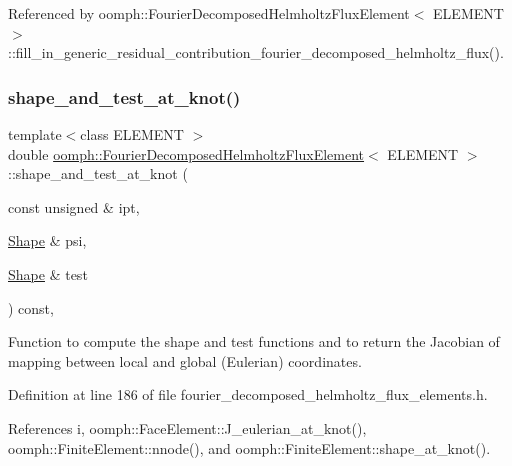 Referenced by oomph\+::\+Fourier\+Decomposed\+Helmholtz\+Flux\+Element$<$ E\+L\+E\+M\+E\+N\+T $>$\+::fill\+\_\+in\+\_\+generic\+\_\+residual\+\_\+contribution\+\_\+fourier\+\_\+decomposed\+\_\+helmholtz\+\_\+flux().

\mbox{\label{classoomph_1_1FourierDecomposedHelmholtzFluxElement_a5a16370bac4c75e810cf910957c2f978}} 
\subsubsection{\texorpdfstring{shape\+\_\+and\+\_\+test\+\_\+at\+\_\+knot()}{shape\_and\_test\_at\_knot()}}
{\footnotesize\ttfamily template$<$class E\+L\+E\+M\+E\+NT $>$ \\
double \hyperlink{classoomph_1_1FourierDecomposedHelmholtzFluxElement}{oomph\+::\+Fourier\+Decomposed\+Helmholtz\+Flux\+Element}$<$ E\+L\+E\+M\+E\+NT $>$\+::shape\+\_\+and\+\_\+test\+\_\+at\+\_\+knot (\begin{DoxyParamCaption}\item[{const unsigned \&}]{ipt,  }\item[{\hyperlink{classoomph_1_1Shape}{Shape} \&}]{psi,  }\item[{\hyperlink{classoomph_1_1Shape}{Shape} \&}]{test }\end{DoxyParamCaption}) const\hspace{0.3cm}{\ttfamily [inline]}, {\ttfamily [protected]}}



Function to compute the shape and test functions and to return the Jacobian of mapping between local and global (Eulerian) coordinates. 



Definition at line 186 of file fourier\+\_\+decomposed\+\_\+helmholtz\+\_\+flux\+\_\+elements.\+h.



References i, oomph\+::\+Face\+Element\+::\+J\+\_\+eulerian\+\_\+at\+\_\+knot(), oomph\+::\+Finite\+Element\+::nnode(), and oomph\+::\+Finite\+Element\+::shape\+\_\+at\+\_\+knot().

